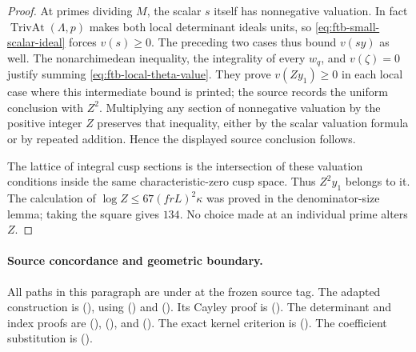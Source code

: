 \begin{proof}
At primes dividing \(M\), the scalar \(s\) itself has nonnegative
valuation.  In fact \(\operatorname{TrivAt}(\Lambda,p)\)
makes both local determinant ideals units, so
\eqref{eq:ftb-small-scalar-ideal} forces \(v(s)\ge0\).
The preceding two cases thus bound \(v(sy)\) as well.
The nonarchimedean inequality, the integrality of every \(w_q\),
and \(v(\zeta)=0\) justify summing \eqref{eq:ftb-local-theta-value}.
They prove \(v(Zy_1)\ge0\) in each local case where this intermediate
bound is printed; the source records the uniform conclusion with
\(Z^2\).
Multiplying any section of nonnegative valuation by the positive
integer \(Z\) preserves that inequality, either by the scalar
valuation formula or by repeated addition.
Hence the displayed source conclusion follows.

The lattice of integral cusp sections is the intersection of
these valuation conditions inside the same characteristic-zero
cusp space.
Thus \(Z^2y_1\) belongs to it.
The calculation of
\(\log Z\le67(frL)^2\kappa\) was proved in the denominator-size
lemma; taking the square gives \(134\).
No choice made at an individual prime alters \(Z\).
\end{proof}

\paragraph{Source concordance and geometric boundary.}
All paths in this paragraph are under
 at the frozen
source tag.
The adapted construction is
(),
using 
()
and 
().
Its Cayley proof is
().
The determinant and index proofs are
(),
(),
and
().
The exact kernel criterion is
().
The coefficient substitution is
().

